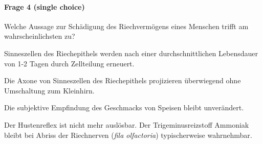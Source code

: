 \paragraph{Frage 4 (single choice)}

Welche Aussage zur Schädigung des Riechvermögens eines Menschen trifft am wahrscheinlichsten zu?
\begin{benumerate}
  \item Sinneszellen des Riechepithels werden nach einer durchschnittlichen Lebensdauer von 1-2 Tagen durch Zellteilung erneuert.
  \item Die Axone von Sinneszellen des Riechepithels projizieren überwiegend ohne Umschaltung zum Kleinhirn.
  \item Die subjektive Empfindung des Geschmacks von Speisen bleibt unverändert.
  \item Der Hustenreflex ist nicht mehr auslösbar.
  \bolditem Der Trigeminusreizstoff Ammoniak bleibt bei Abriss der Riechnerven (\emph{fila olfactoria}) typischerweise wahrnehmbar.
\end{benumerate}